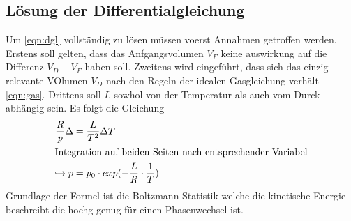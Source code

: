 \subsection{Lösung der Differentialgleichung}
Um \eqref{eqn:dgl} vollständig zu lösen müssen voerst Annahmen getroffen werden. 
Erstens soll gelten, dass das Anfgangsvolumen $V_F$ keine auswirkung auf die Differenz $V_D - V_F$ haben soll. Zweitens wird eingeführt, dass 
sich das einzig relevante VOlumen $V_D$ nach den Regeln der idealen Gasgleichung verhält \eqref{eqn:gas}. Drittens soll $L$ sowhol von der Temperatur
als auch vom Durck abhängig sein.
Es folgt die Gleichung
\begin{align}
    \frac{R}{p} \Delta &= \frac{L}{T^2} \Delta T \\
    \intertext{Integration auf beiden Seiten nach entsprechender Variabel}
    \hookrightarrow p &= p_0 \cdot exp(-\frac{L}{R} \cdot \frac{1}{T})
\end{align}
Grundlage der Formel ist die Boltzmann-Statistik welche die kinetische Energie beschreibt die hochg genug für einen Phasenwechsel ist. 

